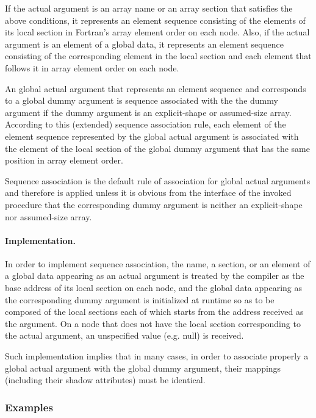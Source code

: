 If the actual argument is an array name or an array section that
satisfies the above conditions, it represents an element sequence
consisting of the elements of its local section in Fortran's array
element order on each node.
%
Also, if the actual argument is an element of a global data, it
represents an element sequence consisting of the corresponding element
in the local section and each element that follows it in array element
order on each node.

An global actual argument that represents an element sequence and
corresponds to a global dummy argument is sequence associated with
the the dummy argument if the dummy argument is an explicit-shape or
assumed-size array.
%
According to this (extended) sequence association rule, each element of
the element sequence represented by the global actual argument is
associated with the element of the local section of the global dummy
argument that has the same position in array element order.

Sequence association is the default rule of association for global
actual arguments and therefore is applied unless it is obvious from the
interface of the invoked procedure that the corresponding dummy argument
is neither an explicit-shape nor assumed-size array.


\paragraph*{Implementation.}

In order to implement sequence association, the name, a section, or an
element of a global data appearing as an actual argument is treated by
the {\XMP} compiler as the base address of its local section on each
node, and the global data appearing as the corresponding dummy argument
is initialized at runtime so as to be composed of the local sections
each of which starts from the address received as the argument.
%
On a node that does not have the local section corresponding to the
actual argument, an unspecified value (e.g. null) is received.

Such implementation implies that in many cases, in order to associate
properly a global actual argument with the global dummy argument, their
mappings (including their shadow attributes) must be identical.


\subsubsection*{Examples}

